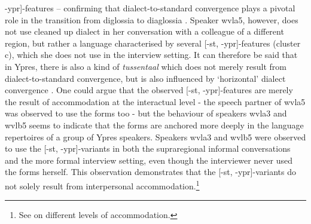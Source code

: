 \documentclass[output=paper]{LSP/langsci}
\begin{document}
-ypr]-features – confirming that dialect-to-standard convergence plays a pivotal role in the transition from diglossia to diaglossia \citep{auer_convergence_1996}. Speaker wvla5, however, does not use cleaned up dialect in her conversation with a colleague of a different region, but rather a language characterised by several [-st, -ypr]-features (cluster c), which she does not use in the interview setting. It can therefore be said that in Ypres, there is also a kind of \textit{tussentaal} which does not merely result from dialect-to-standard convergence, but is also influenced by ‘horizontal’ dialect convergence \citep{auer_convergence_1996}. One could argue that the observed [-st, -ypr]-features are merely the result of accommodation at the interactual level - the speech partner of wvla5 was observed to use the forms too - but the behaviour of speakers wvla3 and wvlb5 seems to indicate that the forms are anchored more deeply in the language repertoires of a group of Ypres speakers. Speakers wvla3 and wvlb5 were observed to use the [-st, -ypr]-variants in both the supraregional informal conversations and the more formal interview setting, even though the interviewer never used the forms herself. This observation demonstrates that the [-st, -ypr]-variants do not solely result from interpersonal accommodation.\footnote{See \citet{auer_convergence_1996} on different levels of accommodation.}

\begin{table}
\end{table}
\end{document}
